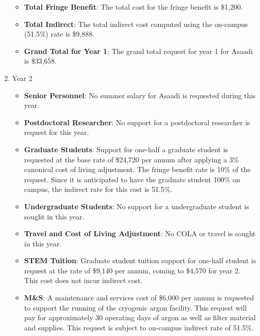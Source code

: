 \begin{enumerate}
\begin{itemize}[noitemsep,nolistsep]
\item {{\bf Total Fringe Benefit}: The total cost for the fringe benefit is \$1,200.}

\item {{\bf Total Indirect}: The total indirect cost computed using the on-campus (51.5\%) rate is \$9,888.}

\item {{\bf Grand Total for Year 1}: The grand total request for year 1 for Asaadi is \$33,658.}

\end{itemize}

\item{Year 2}
\begin{itemize}[noitemsep,nolistsep]

\item{{\bf Senior Personnel}: No summer salary for Asaadi is requested during this year.}

\item {{\bf Postdoctoral Researcher}: No support for a postdoctoral researcher is request for this year.} 

\item{{\bf Graduate Students}: Support for one-half a graduate student is requested at the base rate of \$24,720 per annum after applying a 3\% canonical cost of living adjustment.   The fringe benefit rate is 10\% of the request.  Since it is anticipated to have the graduate student 100\% on campus, the indirect rate for this cost is 51.5\%.}

\item {{\bf Undergraduate Students}: No support for a undergraduate student is sought in this year.}

\item{{\bf Travel and Cost of Living Adjustment}: No COLA or travel is sought in this year.}

\item {{\bf STEM Tuition}: Graduate student tuition support for one-half student is request at the rate of \$9,140 per annum, coming to \$4,570 for year 2.  This cost does not incur indirect cost.}

\item {{\bf M\&S}: A maintenance and services cost of \$6,000 per annum is requested to support the running of the cryogenic argon facility. This request will pay for approximately 30 operating days of argon as well as filter material and supplies.    This request is subject to on-campus indirect rate of 51.5\%.}


\end{itemize}
\end{enumerate}
